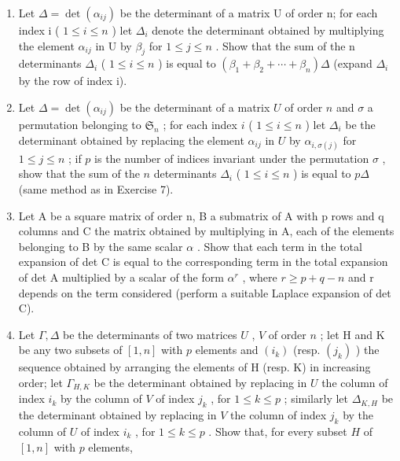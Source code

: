 \begin{enumerate}
\def\labelenumi{\arabic{enumi}.}
\setcounter{enumi}{6}
\item
  Let \(\Delta = \det(\alpha_{ij})\) be the determinant of a matrix U of order n; for each index i ( \(1 \leqslant i \leqslant n\) ) let \(\Delta_i\) denote the determinant obtained by multiplying the element \(\alpha_{ij}\) in U by \(\beta_j\) for \(1 \leqslant j \leqslant n\) . Show that the sum of the n determinants \(\Delta_i\) ( \(1 \leqslant i \leqslant n\) ) is equal to \((\beta_1 + \beta_2 + \cdots + \beta_n)\Delta\) (expand \(\Delta_i\) by the row of index i).
\item
  Let \(\Delta = \det(\alpha_{ij})\) be the determinant of a matrix \(U\) of order \(n\) and \(\sigma\) a permutation belonging to \(\mathfrak{S}_n\) ; for each index \(i\) ( \(1 \leqslant i \leqslant n\) ) let \(\Delta_i\) be the determinant obtained by replacing the element \(\alpha_{ij}\) in \(U\) by \(\alpha_{i,\sigma(j)}\) for \(1 \leqslant j \leqslant n\) ; if \(p\) is the number of indices invariant under the permutation \(\sigma\) , show that the sum of the \(n\) determinants \(\Delta_i\) ( \(1 \leqslant i \leqslant n\) ) is equal to \(p\Delta\) (same method as in Exercise 7).
\item
  Let A be a square matrix of order n, B a submatrix of A with p rows and q columns and C the matrix obtained by multiplying in A, each of the elements belonging to B by the same scalar \(\alpha\) . Show that each term in the total expansion of det C is equal to the corresponding term in the total expansion of det A multiplied by a scalar of the form \(\alpha^{r}\) , where \(r \geqslant p + q - n\) and r depends on the term considered (perform a suitable Laplace expansion of det C).
\item
  Let \(\Gamma, \Delta\) be the determinants of two matrices \(U\) , \(V\) of order \(n\) ; let H and K be any two subsets of \([1, n]\) with \(p\) elements and \((i_k)\) (resp. \((j_k)\) ) the sequence obtained by arranging the elements of H (resp. K) in increasing order; let \(\Gamma_{H,K}\) be the determinant obtained by replacing in \(U\) the column of index \(i_k\) by the column of \(V\) of index \(j_k\) , for \(1 \leqslant k \leqslant p\) ; similarly let \(\Delta_{K,H}\) be the determinant obtained by replacing in \(V\) the column of index \(j_k\) by the column of \(U\) of index \(i_k\) , for \(1 \leqslant k \leqslant p\) . Show that, for every subset \(H\) of \([1, n]\) with \(p\) elements,
\end{enumerate}

